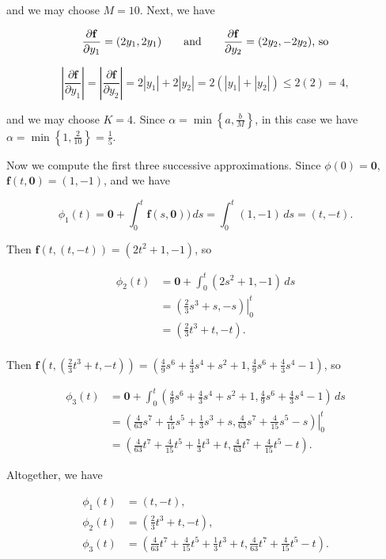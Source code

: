 \documentclass[11pt,oneside,english]{amsart}
\theoremstyle{definition}
\newcommand{\aspace}{\hspace{7mm}\text{and}\hspace{7mm}}
\newcommand{\pp}[2]{\frac{\partial{#1}}{\partial{#2}}}
\begin{document}
\begin{enumerate}
and we may choose $M=10$. Next, we have

\[
\pp{\mathbf{f}}{y_1}=(2y_1,2y_1)\aspace\pp{\mathbf{f}}{y_2}=(2y_2,-2y_2)\text{, so}
\]


\[
\left|\pp{\mathbf{f}}{y_1}\right|=\left|\pp{\mathbf{f}}{y_2}\right|=2|y_1|+2|y_2|=2(|y_1|+|y_2|)\leq2(2)=4,
\]

and we may choose $K=4$. Since $\alpha=\min\left\{a,\frac{b}{M}\right\}$, in this case we have $\alpha=\min\left\{1,\frac{2}{10}\right\}=\frac{1}{5}$. 

Now we compute the first three successive approximations. Since $\phi(0)=\mathbf{0}$, $\mathbf{f}(t,\mathbf{0})=(1,-1)$, and we have

\[
\phi_1(t)=\mathbf{0}+\int_0^t\mathbf{f}(s,\mathbf{0}))\,ds=\int_0^t(1,-1)\,ds=(t,-t).
\]

Then $\mathbf{f}(t,(t,-t))=(2t^2+1,-1)$, so

\begin{align*}
\phi_2(t)&=\mathbf{0}+\int_0^t(2s^2+1,-1)\,ds\\[2mm]
&=\left.\left(\frac{2}{3}s^3+s,-s\right)\right|_0^t\\[2mm]
&=\left(\frac{2}{3}t^3+t,-t\right).\\[2mm]
\end{align*}

Then $\mathbf{f}\left(t,\left(\frac{2}{3}t^3+t,-t\right)\right)=\left(\frac{4}{9}s^6+\frac{4}{3}s^4+s^2+1,\frac{4}{9}s^6+\frac{4}{3}s^4-1\right)$, so

\begin{align*}
\phi_3(t)&=\mathbf{0}+\int_0^t\left(\frac{4}{9}s^6+\frac{4}{3}s^4+s^2+1,\frac{4}{9}s^6+\frac{4}{3}s^4-1\right)\,ds\\[2mm]
&=\left.\left(\frac{4}{63}s^7+\frac{4}{15}s^5+\frac{1}{3}s^3+s,\frac{4}{63}s^7+\frac{4}{15}s^5-s\right)\right|_0^t\\[2mm]
&=\left(\frac{4}{63}t^7+\frac{4}{15}t^5+\frac{1}{3}t^3+t,\frac{4}{63}t^7+\frac{4}{15}t^5-t\right).
\end{align*}

Altogether, we have 

\begin{align*}
\phi_1(t)&=(t,-t),\\[2mm]
\phi_2(t)&=\left(\frac{2}{3}t^3+t,-t\right),\\[2mm]
\phi_3(t)&=\left(\frac{4}{63}t^7+\frac{4}{15}t^5+\frac{1}{3}t^3+t,\frac{4}{63}t^7+\frac{4}{15}t^5-t\right).
\end{align*}


\end{enumerate}
\end{document}
